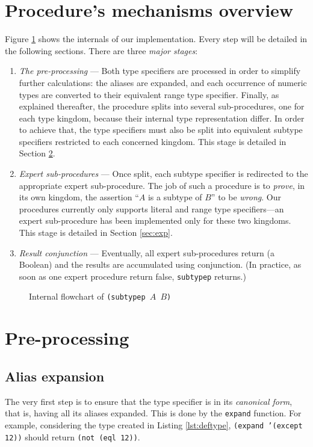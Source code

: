\documentclass[format=sigconf]{acmart}
\newcommand\code[2][\small]{\sloppy\texttt{#1#2}}
\theoremstyle{definition}
\begin{document}
\section{Procedure's mechanisms overview}
\label{sec:flow}
Figure \ref{fig:flow} shows the internals of our implementation. Every step will
be detailed in the following sections. There are three \emph{major stages}:

\begin{enumerate}
\item \emph{The pre-processing} --- Both type specifiers are processed in order to
  simplify further calculations: the aliases are expanded, and each occurrence
  of numeric types are converted to their equivalent range type specifier.
  Finally, as explained thereafter, the procedure splits into several
  sub-procedures, one for each type kingdom, because their internal
  type representation differ. In order to achieve that, the type specifiers must
  also be split into equivalent subtype specifiers restricted to each concerned
  kingdom.
  This stage is detailed in Section \ref{sec:pre}.
\item \emph{Expert sub-procedures} --- Once split, each subtype specifier is
  redirected to the appropriate expert sub-procedure. The job of such a procedure is to
  \emph{prove}, in its own kingdom, the assertion ``$A$ is a subtype of $B$'' to
  be \emph{wrong}.
  Our procedures currently only supports literal and range type specifiers---an
  expert sub-procedure has been implemented only for these two kingdoms. This
  stage is detailed in Section \ref{sec:exp}.
\item \emph{Result conjunction} --- Eventually, all expert sub-procedures
  return (a Boolean) and the results are accumulated using conjunction.
  (In practice, as soon as one expert procedure return false, \code{subtypep}
  returns.)
\end{enumerate}

\begin{figure}
  \centering
  
  \caption{Internal flowchart of \code{(subtypep $A$ $B$)}}
  \label{fig:flow}
\end{figure}

\section{Pre-processing}
\label{sec:pre}
\subsection{Alias expansion}
The very first step is to ensure that the type specifier is in its
\emph{canonical form}, that is, having all its aliases expanded. This is done by
the \code{expand} function. For example, considering the type created in
Listing \ref{lst:deftype}, \code{(expand '(except 12))} should return \code{(not
  (eql 12))}.
\end{document}
